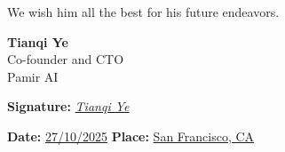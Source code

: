 \documentclass[12pt,a4paper]{report}
\begin{document}
\vspace{0.5cm}

We wish him all the best for his future endeavors.

\vspace{2cm}

\noindent
\textbf{Tianqi Ye} \\
Co-founder and CTO \\
Pamir AI

\vspace{1.5cm}

\noindent
\textbf{Signature:} \underline{\hspace{2cm}\textit{Tianqi Ye}\hspace{2cm}}

\vspace{0.5cm}

\noindent
\textbf{Date:} \underline{\hspace{1cm}27/10/2025\hspace{1cm}} \hspace{1cm} \textbf{Place:} \underline{\hspace{1cm}San Francisco, CA\hspace{1cm}}

%
%
%
%
%
%
%
%
\end{document}
